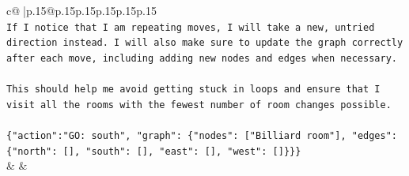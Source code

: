 \documentclass{article}
\begin{document}
{\begin{supertabular}{c@{$\;$}|p{.15\linewidth}@{}p{.15\linewidth}p{.15\linewidth}p{.15\linewidth}p{.15\linewidth}p{.15\linewidth}}
{{{\\ 
\texttt{If I notice that I am repeating moves, I will take a new, untried direction instead. I will also make sure to update the graph correctly after each move, including adding new nodes and edges when necessary. } \\
\\ 
\texttt{This should help me avoid getting stuck in loops and ensure that I visit all the rooms with the fewest number of room changes possible.} \\
\\ 
\texttt{\{"action":"GO: south", "graph": \{"nodes": {[}"Billiard room"{]}, "edges": \{"north": {[}{]}, "south": {[}{]}, "east": {[}{]}, "west": {[}{]}\}\}\}} \\
            }
        }
    }
    & & \\ \\

\end{supertabular}
}
\end{document}
